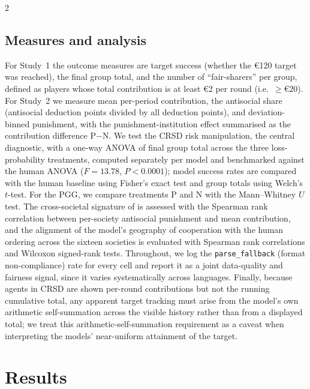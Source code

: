 \documentclass[openacc]{rsproca_new}%
\begin{document}
\begin{multicols}{2}
\subsection{Measures and analysis}
For Study~1 the outcome measures are target success (whether the €120 target was reached), the final group total, and the number of ``fair-sharers'' per group, defined as players whose total contribution is at least €2 per round (i.e.\ $\geq€20$). For Study~2 we measure mean per-period contribution, the antisocial share (antisocial deduction points divided by all deduction points), and deviation-binned punishment, with the punishment-institution effect summarised as the contribution difference P$-$N. We test the CRSD risk manipulation, the central diagnostic, with a one-way ANOVA of final group total across the three loss-probability treatments, computed separately per model and benchmarked against the human ANOVA ($F=13.78$, $P<0.0001$); model success rates are compared with the human baseline using Fisher's exact test and group totals using Welch's $t$-test. For the PGG, we compare treatments P and N with the Mann--Whitney $U$ test. The cross-societal signature of \textcite{herrmann2008antisocial} is assessed with the Spearman rank correlation between per-society antisocial punishment and mean contribution, and the alignment of the model's geography of cooperation with the human ordering across the sixteen societies is evaluated with Spearman rank correlations and Wilcoxon signed-rank tests. Throughout, we log the \texttt{parse\_fallback} (format non-compliance) rate for every cell and report it as a joint data-quality and fairness signal, since it varies systematically across languages. Finally, because agents in CRSD are shown per-round contributions but not the running cumulative total, any apparent target tracking must arise from the model's own arithmetic self-summation across the visible history rather than from a displayed total; we treat this arithmetic-self-summation requirement as a caveat when interpreting the models' near-uniform attainment of the target.

\section{Results}


\end{multicols}
\end{document}
